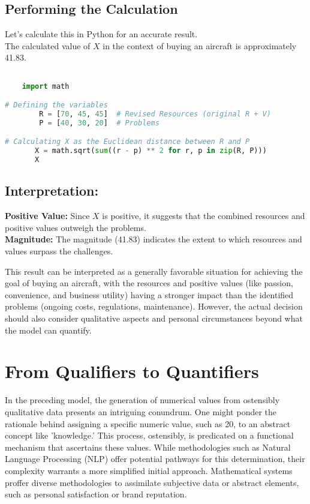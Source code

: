 \documentclass{article}
\begin{document}
\subsection*{Performing the Calculation}
Let's calculate this in Python for an accurate result.\\	
The calculated value of \( X \) in the context of buying an aircraft is approximately 41.83.

\begin{lstlisting}[language=Python]

	import math

# Defining the variables
        R = [70, 45, 45]  # Revised Resources (original R + V)
        P = [40, 30, 20]  # Problems

# Calculating X as the Euclidean distance between R and P
       X = math.sqrt(sum((r - p) ** 2 for r, p in zip(R, P)))
       X	
	\end{lstlisting}

\subsection*{Interpretation:}
\textbf{Positive Value:} Since \( X \) is positive, it suggests that the combined resources and positive values outweigh the problems.\\
\textbf{Magnitude:} The magnitude (41.83) indicates the extent to which resources and values surpass the challenges.

This result can be interpreted as a generally favorable situation for achieving the goal of buying an aircraft, with the resources and positive values (like passion, convenience, and business utility) having a stronger impact than the identified problems (ongoing costs, regulations, maintenance). However, the actual decision should also consider qualitative aspects and personal circumstances beyond what the model can quantify.


\section{From Qualifiers to Quantifiers}

In the preceding model, the generation of numerical values from ostensibly qualitative data presents an intriguing conundrum. One might ponder the rationale behind assigning a specific numeric value, such as 20, to an abstract concept like 'knowledge.' This process, ostensibly, is predicated on a functional mechanism that ascertains these values. While methodologies such as Natural Language Processing (NLP) offer potential pathways for this determination, their complexity warrants a more simplified initial approach. Mathematical systems proffer diverse methodologies to assimilate subjective data or abstract elements, such as personal satisfaction or brand reputation.
\end{document}
